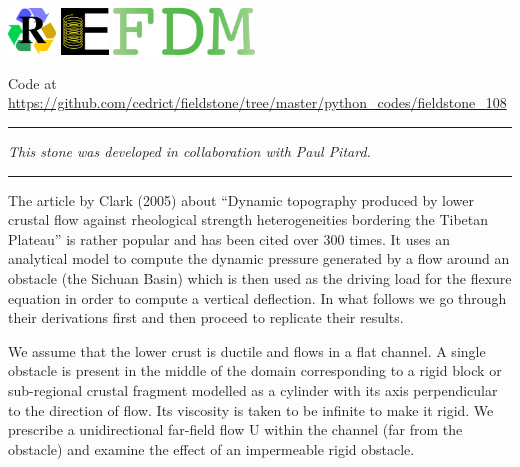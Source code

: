 \includegraphics[height=1.25cm]{images/pictograms/replication}
\includegraphics[height=1.25cm]{images/pictograms/elasticity}
\includegraphics[height=1.25cm]{images/pictograms/FDM}




\begin{center}
Code at \url{https://github.com/cedrict/fieldstone/tree/master/python_codes/fieldstone_108}
\end{center}

\par\noindent\rule{\textwidth}{0.4pt}

{\sl This stone was developed in collaboration with Paul Pitard.} 

\par\noindent\rule{\textwidth}{0.4pt}


The article by Clark \etal (2005) \cite{clbr05} about ``Dynamic topography produced by lower crustal 
flow against rheological strength heterogeneities bordering the Tibetan Plateau'' 
is rather popular and has been cited over 300 times. It uses an analytical model to compute the 
dynamic pressure generated by a flow around an obstacle (the Sichuan Basin) which is then 
used as the driving load for the flexure equation in 
order to compute a vertical deflection. In what follows we go through their derivations first and 
then proceed to replicate their results.  

We assume that the lower crust is ductile and flows in a flat channel. A single obstacle is present in 
the middle of the domain corresponding to a rigid block or sub-regional crustal fragment modelled as 
a cylinder with its axis perpendicular to the direction of flow.
Its viscosity is taken to be infinite to make it rigid. 
We prescribe a unidirectional far-field flow U within the channel (far from the obstacle) 
and examine the effect of an impermeable rigid obstacle. 

